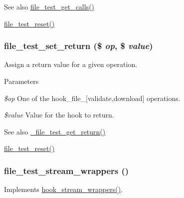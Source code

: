 \begin{DoxySeeAlso}{See also}
\hyperlink{file__test_8module_a43842b551a9a076a33290c02b9c567b0}{file\_\-test\_\-get\_\-calls()} 

\hyperlink{file__test_8module_ac3231cdae85b5f6631a201a2f56e9d84}{file\_\-test\_\-reset()} 
\end{DoxySeeAlso}
\hypertarget{file__test_8module_a5af89506d8703c84616e6595bc088a7f}{
\subsubsection[{file\_\-test\_\-set\_\-return}]{\setlength{\rightskip}{0pt plus 5cm}file\_\-test\_\-set\_\-return (\$ {\em op}, \/  \$ {\em value})}}
\label{file__test_8module_a5af89506d8703c84616e6595bc088a7f}
Assign a return value for a given operation.


\begin{DoxyParams}{Parameters}
\item[{\em \$op}]One of the hook\_\-file\_\-\mbox{[}validate,download\mbox{]} operations. \item[{\em \$value}]Value for the hook to return.\end{DoxyParams}
\begin{DoxySeeAlso}{See also}
\hyperlink{file__test_8module_a7102eea8d64b4742d521968ca7653bdd}{\_\-file\_\-test\_\-get\_\-return()} 

\hyperlink{file__test_8module_ac3231cdae85b5f6631a201a2f56e9d84}{file\_\-test\_\-reset()} 
\end{DoxySeeAlso}
\hypertarget{file__test_8module_a76102017424892a480ae784238ca1c6d}{
\subsubsection[{file\_\-test\_\-stream\_\-wrappers}]{\setlength{\rightskip}{0pt plus 5cm}file\_\-test\_\-stream\_\-wrappers ()}}
\label{file__test_8module_a76102017424892a480ae784238ca1c6d}
Implements \hyperlink{group__hooks_ga6fadcf625a4766e7f0d97b1628b294dc}{hook\_\-stream\_\-wrappers()}. 